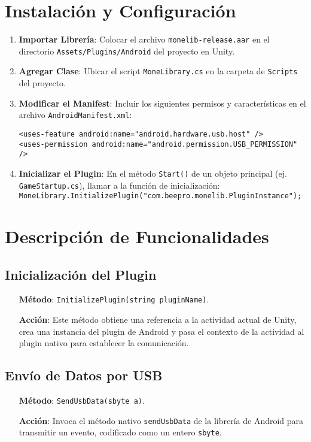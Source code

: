 \section*{Instalación y Configuración}
\begin{enumerate}
    \item \textbf{Importar Librería}: Colocar el archivo \texttt{monelib-release.aar} en el directorio \texttt{Assets/Plugins/Android} del proyecto en Unity.
    \item \textbf{Agregar Clase}: Ubicar el script \texttt{MoneLibrary.cs} en la carpeta de \texttt{Scripts} del proyecto.
    \item \textbf{Modificar el Manifest}: Incluir los siguientes permisos y características en el archivo \texttt{AndroidManifest.xml}:
    \begin{verbatim}
<uses-feature android:name="android.hardware.usb.host" />
<uses-permission android:name="android.permission.USB_PERMISSION" />
    \end{verbatim}
    \item \textbf{Inicializar el Plugin}: En el método \texttt{Start()} de un objeto principal (ej. \texttt{GameStartup.cs}), llamar a la función de inicialización: \\
    \texttt{MoneLibrary.InitializePlugin("com.beepro.monelib.PluginInstance");}
\end{enumerate}

\section*{Descripción de Funcionalidades}
\subsection*{Inicialización del Plugin}
\begin{itemize}
    \item[\textbf{Método}:] \texttt{InitializePlugin(string pluginName)}.
    \item[\textbf{Acción}:] Este método obtiene una referencia a la actividad actual de Unity, crea una instancia del plugin de Android y pasa el contexto de la actividad al plugin nativo para establecer la comunicación.
\end{itemize}

\subsection*{Envío de Datos por USB}
\begin{itemize}
    \item[\textbf{Método}:] \texttt{SendUsbData(sbyte a)}.
    \item[\textbf{Acción}:] Invoca el método nativo \texttt{sendUsbData} de la librería de Android para transmitir un evento, codificado como un entero \texttt{sbyte}.
\end{itemize}

